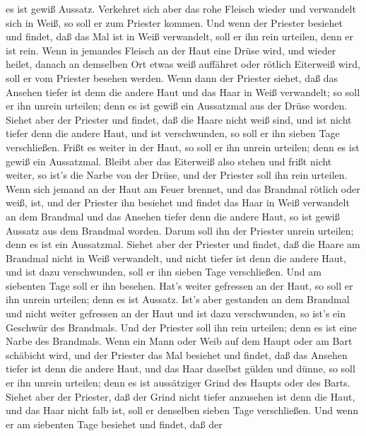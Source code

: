 es ist gewiß Aussatz.  Verkehret sich aber das rohe Fleisch
wieder und verwandelt sich in Weiß, so soll er zum Priester kommen.
 Und wenn der Priester besiehet und findet, daß das Mal ist
in Weiß verwandelt, soll er ihn rein urteilen, denn er ist rein.
 Wenn in jemandes Fleisch an der Haut eine Drüse wird, und
wieder heilet,  danach an demselben Ort etwas weiß
auffähret oder rötlich Eiterweiß wird, soll er vom Priester besehen
werden.  Wenn dann der Priester siehet, daß das Ansehen
tiefer ist denn die andere Haut und das Haar in Weiß verwandelt; so soll
er ihn unrein urteilen; denn es ist gewiß ein Aussatzmal aus der Drüse
worden.  Siehet aber der Priester und findet, daß die Haare
nicht weiß sind, und ist nicht tiefer denn die andere Haut, und ist
verschwunden, so soll er ihn sieben Tage verschließen. 
Frißt es weiter in der Haut, so soll er ihn unrein urteilen; denn es ist
gewiß ein Aussatzmal.  Bleibt aber das Eiterweiß also
stehen und frißt nicht weiter, so ist's die Narbe von der Drüse, und der
Priester soll ihn rein urteilen.  Wenn sich jemand an der
Haut am Feuer brennet, und das Brandmal rötlich oder weiß, ist,
 und der Priester ihn besiehet und findet das Haar in Weiß
verwandelt an dem Brandmal und das Ansehen tiefer denn die andere Haut,
so ist gewiß Aussatz aus dem Brandmal worden. Darum soll ihn der
Priester unrein urteilen; denn es ist ein Aussatzmal. 
Siehet aber der Priester und findet, daß die Haare am Brandmal nicht in
Weiß verwandelt, und nicht tiefer ist denn die andere Haut, und ist dazu
verschwunden, soll er ihn sieben Tage verschließen.  Und am
siebenten Tage soll er ihn besehen. Hat's weiter gefressen an der Haut,
so soll er ihn unrein urteilen; denn es ist Aussatz.  Ist's
aber gestanden an dem Brandmal und nicht weiter gefressen an der Haut
und ist dazu verschwunden, so ist's ein Geschwür des Brandmals. Und der
Priester soll ihn rein urteilen; denn es ist eine Narbe des Brandmals.
 Wenn ein Mann oder Weib auf dem Haupt oder am Bart
schäbicht wird,  und der Priester das Mal besiehet und
findet, daß das Ansehen tiefer ist denn die andere Haut, und das Haar
daselbst gülden und dünne, so soll er ihn unrein urteilen; denn es ist
aussätziger Grind des Haupts oder des Barts.  Siehet aber
der Priester, daß der Grind nicht tiefer anzusehen ist denn die Haut,
und das Haar nicht falb ist, soll er denselben sieben Tage verschließen.
 Und wenn er am siebenten Tage besiehet und findet, daß der
